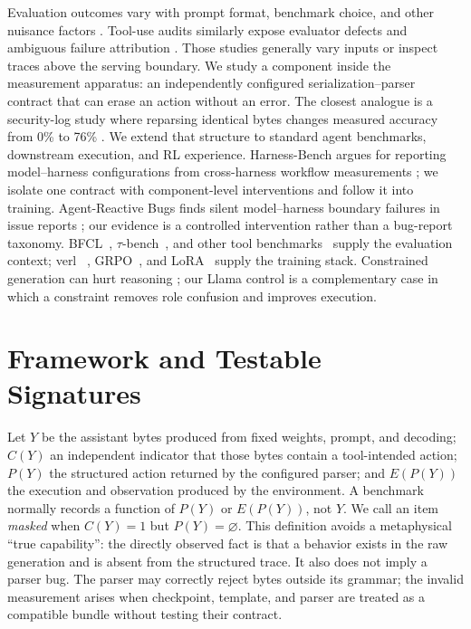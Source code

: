Evaluation outcomes vary with prompt format, benchmark choice, and other nuisance factors
\citep{sclar2024formatspread,mizrahi2024stateofwhatart,dehghani2021benchmarklottery}. Tool-use
audits similarly expose evaluator defects and ambiguous failure attribution
\citep{bhat2026benchmarkingbenchmarks,raj2026modelorharness,soni2026toolfailbench,albayaydh2026beyondleaderboard}.
Those studies generally vary inputs or inspect traces above the serving boundary. We study a
component inside the measurement apparatus: an independently configured serialization--parser
contract that can erase an action without an error. The closest analogue is a security-log study
where reparsing identical bytes changes measured accuracy from 0\% to 76\%
\citep{garware2026brokenruler}. We extend that structure to standard agent benchmarks, downstream
execution, and RL experience. Harness-Bench argues for reporting model--harness configurations
from cross-harness workflow measurements \citep{yao2026harnessbench}; we isolate one contract with
component-level interventions and follow it into training. Agent-Reactive Bugs finds silent
model--harness boundary failures in issue reports \citep{chen2026agentreactive}; our evidence is a
controlled intervention rather than a bug-report taxonomy. BFCL~\citep{bfcl2025}, $\tau$-bench~\citep{yao2025taubench}, and
other tool benchmarks~\citep{qin2024toolllm,li2023apibank} supply the evaluation context; verl
~\citep{sheng2025hybridflow}, GRPO~\citep{shao2024deepseekmath}, and LoRA~\citep{hu2022lora}
supply the training stack. Constrained generation can hurt reasoning
\citep{tam2024speakfreely}; our Llama control is a complementary case in which a constraint removes
role confusion and improves execution.

\section{Framework and Testable Signatures}
\label{sec:framework}

Let $Y$ be the assistant bytes produced from fixed weights, prompt, and decoding; $C(Y)$ an
independent indicator that those bytes contain a tool-intended action; $P(Y)$ the structured action
returned by the configured parser; and $E(P(Y))$ the execution and observation produced by the
environment. A benchmark normally records a function of $P(Y)$ or $E(P(Y))$, not $Y$. We call an
item \emph{masked} when $C(Y)=1$ but $P(Y)=\varnothing$. This definition avoids a metaphysical
``true capability'': the directly observed fact is that a behavior exists in the raw generation
and is absent from the structured trace. It also does not imply a parser bug. The parser may
correctly reject bytes outside its grammar; the invalid measurement arises when checkpoint,
template, and parser are treated as a compatible bundle without testing their contract.

